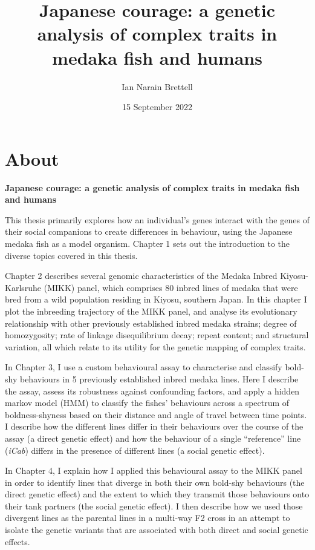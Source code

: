\documentclass[
]{book}
\title{Japanese courage: a genetic analysis of complex traits in medaka fish and humans}
\author{Ian Narain Brettell}
\date{15 September 2022}
\begin{document}
\maketitle

{
\setcounter{tocdepth}{1}
\tableofcontents
}
\hypertarget{about}{%
\chapter*{About}\label{about}}

\textbf{Japanese courage: a genetic analysis of complex traits in medaka fish and humans}

This thesis primarily explores how an individual's genes interact with the genes of their social companions to create differences in behaviour, using the Japanese medaka fish as a model organism. Chapter 1 sets out the introduction to the diverse topics covered in this thesis.

Chapter 2 describes several genomic characteristics of the Medaka Inbred Kiyosu-Karlsruhe (MIKK) panel, which comprises 80 inbred lines of medaka that were bred from a wild population residing in Kiyosu, southern Japan. In this chapter I plot the inbreeding trajectory of the MIKK panel, and analyse its evolutionary relationship with other previously established inbred medaka strains; degree of homozygosity; rate of linkage disequilibrium decay; repeat content; and structural variation, all which relate to its utility for the genetic mapping of complex traits.

In Chapter 3, I use a custom behavioural assay to characterise and classify bold-shy behaviours in 5 previously established inbred medaka lines. Here I describe the assay, assess its robustness against confounding factors, and apply a hidden markov model (HMM) to classify the fishes' behaviours across a spectrum of boldness-shyness based on their distance and angle of travel between time points. I describe how the different lines differ in their behaviours over the course of the assay (a direct genetic effect) and how the behaviour of a single ``reference'' line (\emph{iCab}) differs in the presence of different lines (a social genetic effect).

In Chapter 4, I explain how I applied this behavioural assay to the MIKK panel in order to identify lines that diverge in both their own bold-shy behaviours (the direct genetic effect) and the extent to which they transmit those behaviours onto their tank partners (the social genetic effect). I then describe how we used those divergent lines as the parental lines in a multi-way F2 cross in an attempt to isolate the genetic variants that are associated with both direct and social genetic effects.
\end{document}
